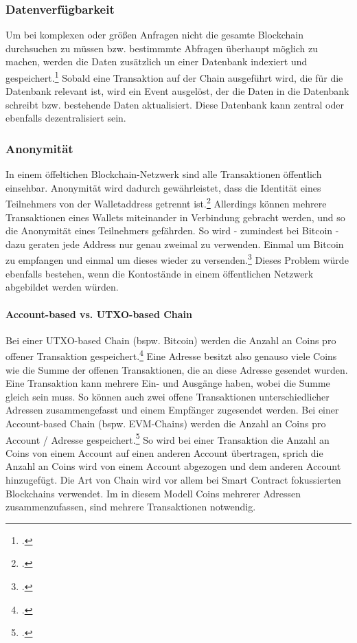 \documentclass[12pt, a4paper]{article}
\begin{document}
{\subsubsection{Datenverfügbarkeit}
\label{sec:Datenverfügbarkeit}
Um bei komplexen oder größen Anfragen nicht die gesamte Blockchain durchsuchen zu müssen bzw. bestimmmte Abfragen überhaupt möglich zu machen, werden die Daten zusätzlich un einer Datenbank indexiert und gespeichert.\footcites[Vgl. hierzu und im Folgenden][]{w32}[]{w33}
Sobald eine Transaktion auf der Chain ausgeführt wird, die für die Datenbank relevant ist, wird ein Event ausgelöst, der die Daten in die Datenbank schreibt bzw. bestehende Daten aktualisiert.
Diese Datenbank kann zentral oder ebenfalls dezentralisiert sein.
\subsubsection{Anonymität}
\label{sec:Anonymität}
In einem öffeltichen Blockchain-Netzwerk sind alle Transaktionen öffentlich einsehbar.
Anonymität wird dadurch gewährleistet, dass die Identität eines Teilnehmers von der Walletaddress getrennt ist.\footcite[Vgl.][6]{q4}
Allerdings können mehrere Transaktionen eines Wallets miteinander in Verbindung gebracht werden, und so die Anonymität eines Teilnehmers gefährden. So wird - zumindest bei Bitcoin - dazu geraten jede Address nur genau zweimal zu verwenden. Einmal um Bitcoin zu empfangen und einmal um dieses wieder zu versenden.\footcite[Vgl.][]{w15}
Dieses Problem würde ebenfalls bestehen, wenn die Kontostände in einem öffentlichen Netzwerk abgebildet werden würden.

\paragraph{Account-based vs. UTXO-based Chain}
\label{sec:definition-account-based-vs-utxo-based-chain}
\noindent
Bei einer UTXO-based Chain (bspw. Bitcoin) werden die Anzahl an Coins pro offener Transaktion gespeichert.\footcite[Vgl. hierzu und zum Folgenden sowie weiterführend][S. 182 ff\adddot]{q5}
Eine Adresse besitzt also genauso viele Coins wie die Summe der offenen Transaktionen, die an diese Adresse gesendet wurden.
Eine Transaktion kann mehrere Ein- und Ausgänge haben, wobei die Summe gleich sein muss.
So können auch zwei offene Transaktionen unterschiedlicher Adressen zusammengefasst und einem Empfänger zugesendet werden.
\bigbreak
\noindent
Bei einer Account-based Chain (bspw. EVM-Chains) werden die Anzahl an Coins pro Account / Adresse gespeichert.\footcite[Vgl. hierzu und zum Folgenden][]{w16} 
So wird bei einer Transaktion die Anzahl an Coins von einem Account auf einen anderen Account übertragen, sprich die Anzahl an Coins wird von einem Account abgezogen und dem anderen Account hinzugefügt.
Die Art von Chain wird vor allem bei Smart Contract fokussierten Blockchains verwendet.
Im in diesem Modell Coins mehrerer Adressen zusammenzufassen, sind mehrere Transaktionen notwendig.

}
\end{document}
